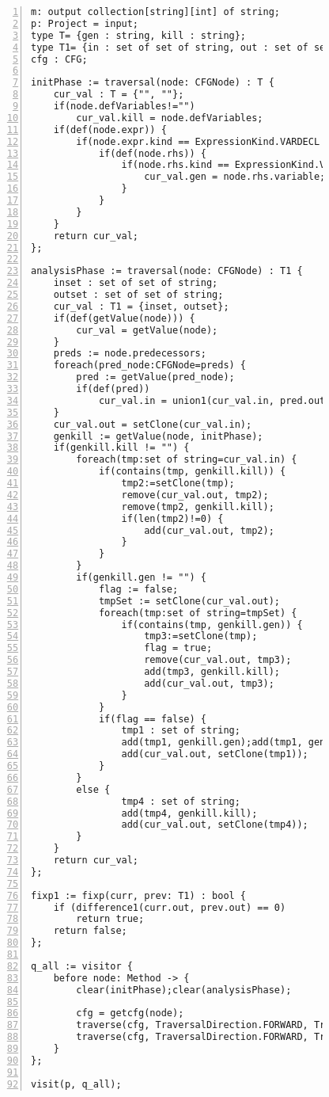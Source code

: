 \begin{figure}[ht!]
\begin{lstlisting}[numbers=left, tabsize=4, escapechar=@, caption={Local may alias},label={lst:lma-code}, lastline = 59] 
m: output collection[string][int] of string;
p: Project = input;
type T= {gen : string, kill : string};
type T1= {in : set of set of string, out : set of set of string};
cfg : CFG;

initPhase := traversal(node: CFGNode) : T {
	cur_val : T = {"", ""};
	if(node.defVariables!="")
		cur_val.kill = node.defVariables;
	if(def(node.expr)) {
		if(node.expr.kind == ExpressionKind.VARDECL || node.expr.kind == ExpressionKind.ASSIGN) {
			if(def(node.rhs)) {
				if(node.rhs.kind == ExpressionKind.VARACCESS) {
					cur_val.gen = node.rhs.variable;
				}
			}
		}
	}
	return cur_val;
};

analysisPhase := traversal(node: CFGNode) : T1 {
	inset : set of set of string;
	outset : set of set of string;
	cur_val : T1 = {inset, outset};
	if(def(getValue(node))) {
		cur_val = getValue(node);
	}	
	preds := node.predecessors;
	foreach(pred_node:CFGNode=preds) {	
		pred := getValue(pred_node);
		if(def(pred))
			cur_val.in = union1(cur_val.in, pred.out);
	}
	cur_val.out = setClone(cur_val.in);
	genkill := getValue(node, initPhase);
	if(genkill.kill != "") {
		foreach(tmp:set of string=cur_val.in) {
			if(contains(tmp, genkill.kill)) {
				tmp2:=setClone(tmp);
				remove(cur_val.out, tmp2);
				remove(tmp2, genkill.kill);
				if(len(tmp2)!=0) {
					add(cur_val.out, tmp2);
				}
			}
		}
		if(genkill.gen != "") {
			flag := false;
			tmpSet := setClone(cur_val.out);
			foreach(tmp:set of string=tmpSet) {
				if(contains(tmp, genkill.gen)) {
					tmp3:=setClone(tmp);
					flag = true;
					remove(cur_val.out, tmp3);
					add(tmp3, genkill.kill);
					add(cur_val.out, tmp3);
				}
			}
			if(flag == false) {
				tmp1 : set of string;
				add(tmp1, genkill.gen);add(tmp1, genkill.kill);
				add(cur_val.out, setClone(tmp1));
			}
		}
		else {
				tmp4 : set of string;
				add(tmp4, genkill.kill);
				add(cur_val.out, setClone(tmp4));
		}
	}
	return cur_val;
};

fixp1 := fixp(curr, prev: T1) : bool {
	if (difference1(curr.out, prev.out) == 0)
		return true;	
	return false;
};

q_all := visitor {
	before node: Method -> {
		clear(initPhase);clear(analysisPhase);

		cfg = getcfg(node);
		traverse(cfg, TraversalDirection.FORWARD, TraversalKind.HYBRID, initPhase);
		traverse(cfg, TraversalDirection.FORWARD, TraversalKind.HYBRID, analysisPhase, fixp1);
	}
};

visit(p, q_all);
\end{lstlisting}
\end{figure}
